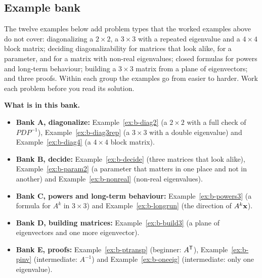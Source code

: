 \documentclass[11pt]{article}
\begin{document}
\subsection*{Example bank}
The twelve examples below add problem types that the worked examples above do not cover: diagonalizing a $2\times2$, a $3\times3$ with a repeated eigenvalue and a $4\times4$ block matrix; deciding diagonalizability for matrices that look alike, for a parameter, and for a matrix with non-real eigenvalues; closed formulas for powers and long-term behaviour; building a $3\times3$ matrix from a plane of eigenvectors; and three proofs. Within each group the examples go from easier to harder. Work each problem before you read its solution.

\textbf{What is in this bank.}
\begin{itemize}
  \item \textbf{Bank A, diagonalize:} Example~\ref{ex:b-diag2} (a $2\times2$ with a full check of $PDP^{-1}$), Example~\ref{ex:b-diag3rep} (a $3\times3$ with a double eigenvalue) and Example~\ref{ex:b-diag4} (a $4\times4$ block matrix).
  \item \textbf{Bank B, decide:} Example~\ref{ex:b-decide} (three matrices that look alike), Example~\ref{ex:b-param2} (a parameter that matters in one place and not in another) and Example~\ref{ex:b-nonreal} (non-real eigenvalues).
  \item \textbf{Bank C, powers and long-term behaviour:} Example~\ref{ex:b-powers3} (a formula for $A^k$ in $3\times3$) and Example~\ref{ex:b-longrun} (the direction of $A^k\mathbf{x}$).
  \item \textbf{Bank D, building matrices:} Example~\ref{ex:b-build3} (a plane of eigenvectors and one more eigenvector).
  \item \textbf{Bank E, proofs:} Example~\ref{ex:b-ptransp} (beginner: $A^{\mathsf T}$), Example~\ref{ex:b-pinv} (intermediate: $A^{-1}$) and Example~\ref{ex:b-oneeig} (intermediate: only one eigenvalue).
\end{itemize}
\end{document}
